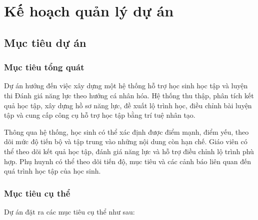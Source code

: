 \chapter{Kế hoạch quản lý dự án}
\label{chap:project-management-plan}

\section{Mục tiêu dự án}

\subsection{Mục tiêu tổng quát}

Dự án hướng đến việc xây dựng một hệ thống hỗ trợ học sinh học tập và
luyện thi Đánh giá năng lực theo hướng cá nhân hóa. Hệ thống thu thập,
phân tích kết quả học tập, xây dựng hồ sơ năng lực, đề xuất lộ trình học,
điều chỉnh bài luyện tập và cung cấp công cụ hỗ trợ học tập bằng trí tuệ
nhân tạo.

Thông qua hệ thống, học sinh có thể xác định được điểm mạnh, điểm yếu,
theo dõi mức độ tiến bộ và tập trung vào những nội dung còn hạn chế.
Giáo viên có thể theo dõi kết quả học tập, đánh giá năng lực và hỗ trợ
điều chỉnh lộ trình phù hợp. Phụ huynh có thể theo dõi tiến độ, mục tiêu
và các cảnh báo liên quan đến quá trình học tập của học sinh.

\subsection{Mục tiêu cụ thể}

Dự án đặt ra các mục tiêu cụ thể như sau:

